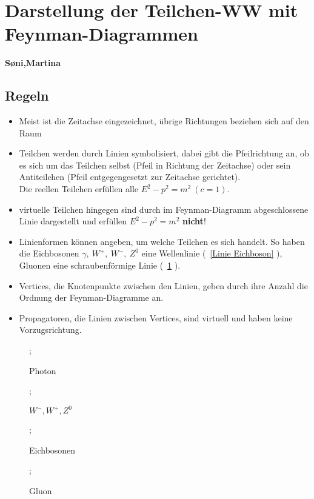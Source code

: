 \documentclass[Ex4_Zusammenfassung.tex]{subfiles}
\begin{document}
\section{Darstellung der Teilchen-WW mit Feynman-Diagrammen}
\textbf{S\o{}ni,Martina}
	\subsection*{Regeln}
	
	\begin{itemize}
		\item Meist ist die Zeitachse eingezeichnet, übrige Richtungen beziehen sich auf den Raum
		\item Teilchen werden durch Linien symbolisiert, dabei gibt die Pfeilrichtung an, ob es sich um das Teilchen selbst (Pfeil in Richtung der Zeitachse) oder sein Antiteilchen (Pfeil entgegengesetzt zur Zeitachse gerichtet).\\
		Die reellen Teilchen erfüllen alle $E^2 - p^2 = m^2\ (c=1)$.
		\item virtuelle Teilchen hingegen sind durch im Feynman-Diagramm abgeschlossene Linie dargestellt und erfüllen $E^2 - p^2 = m^2$ \textbf{nicht}!
		\item Linienformen können angeben, um welche Teilchen es sich handelt. So haben die Eichbosonen $\gamma,\ W^+,\ W^-,\ Z^0$ eine Wellenlinie (~\ref{Linie Eichboson} ), Gluonen eine schraubenförmige Linie (~\ref{Linie Gluon} ).
		\item Vertices, die Knotenpunkte zwischen den Linien, geben durch ihre Anzahl die Ordnung der Feynman-Diagramme an.
		\item Propagatoren, die Linien zwischen Vertices, sind virtuell und haben keine Vorzugsrichtung.
	\end{itemize}
	
	\begin{figure}[h]
		\centering
		;
		\caption{Photon}
		\label{Linie Photon}

		;
		\caption{$W^-,W^+,Z^0$}
		\label{Linie WeakWW} 
		
		;
				\caption{Eichbosonen}
				\label{Linie Eichbosonen}
		
		;
		\caption{Gluon}
		\label{Linie Gluon}
	\end{figure}
	
\end{document}
